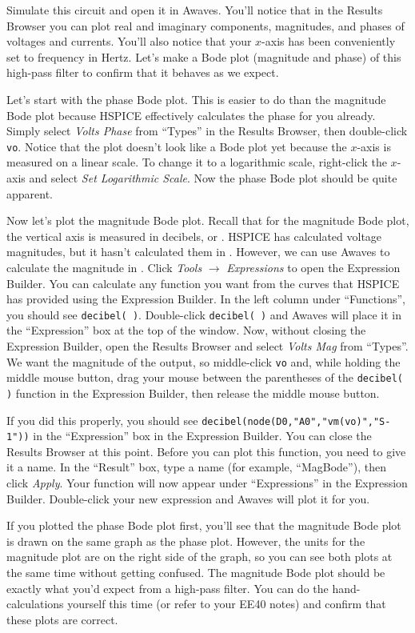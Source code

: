 \documentclass{article}
\begin{document}
Simulate this circuit and open it in Awaves. You'll notice that in the Results Browser you can plot real and imaginary components, magnitudes, and phases of voltages and currents. You'll also notice that your $x$-axis has been conveniently set to frequency in Hertz. Let's make a Bode plot (magnitude and phase) of this high-pass filter to confirm that it behaves as we expect.

Let's start with the phase Bode plot. This is easier to do than the magnitude Bode plot because HSPICE effectively calculates the phase for you already. Simply select \textit{Volts Phase} from ``Types'' in the Results Browser, then double-click \verb|vo|. Notice that the plot doesn't look like a Bode plot yet because the $x$-axis is measured on a linear scale. To change it to a logarithmic scale, right-click the $x$-axis and select \textit{Set Logarithmic Scale}. Now the phase Bode plot should be quite apparent.

Now let's plot the magnitude Bode plot. Recall that for the magnitude Bode plot, the vertical axis is measured in decibels, or \deci\bel. HSPICE has calculated voltage magnitudes, but it hasn't calculated them in \deci\bel. However, we can use Awaves to calculate the magnitude in \deci\bel. Click \textit{Tools} $\rightarrow$ \textit{Expressions} to open the Expression Builder. You can calculate any function you want from the curves that HSPICE has provided using the Expression Builder. In the left column under ``Functions'', you should see \verb|decibel( )|. Double-click \verb|decibel( )| and Awaves will place it in the ``Expression'' box at the top of the window. Now, without closing the Expression Builder, open the Results Browser and select \textit{Volts Mag} from ``Types''. We want the magnitude of the output, so middle-click \verb|vo| and, while holding the middle mouse button, drag your mouse between the parentheses of the \verb|decibel( )| function in the Expression Builder, then release the middle mouse button. 

If you did this properly, you should see \verb|decibel(node(D0,"A0","vm(vo)","S-1"))| in the ``Expression'' box in the Expression Builder. You can close the Results Browser at this point. Before you can plot this function, you need to give it a name. In the ``Result'' box, type a name (for example, ``MagBode''), then click \textit{Apply}. Your function will now appear under ``Expressions'' in the Expression Builder. Double-click your new expression and Awaves will plot it for you.

If you plotted the phase Bode plot first, you'll see that the magnitude Bode plot is drawn on the same graph as the phase plot. However, the units for the magnitude plot are on the right side of the graph, so you can see both plots at the same time without getting confused. The magnitude Bode plot should be exactly what you'd expect from a high-pass filter. You can do the hand-calculations yourself this time (or refer to your EE40 notes) and confirm that these plots are correct.
\end{document}
